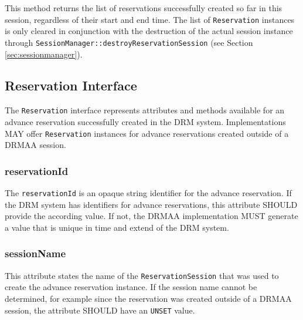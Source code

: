 \documentclass{article}
\newcommand{\h}[1]{\lstinline|#1|}
\newcommand{\rat}[1]{}
\begin{document}
This method returns the list of reservations successfully created so far in this session, regardless of their start and end time. The list of \h{Reservation} instances is only cleared in conjunction with the destruction of the actual session instance through \h{SessionManager::destroyReservationSession} (see Section \ref{sec:sessionmanager}).

\subsection{Reservation Interface}
\label{sec:reservation}

The \h{Reservation} interface represents attributes and methods available for an advance reservation successfully created in the DRM system.  Implementations MAY offer \h{Reservation} instances for advance reservations created outside of a DRMAA session.




\subsubsection{reservationId}
\label{sec:reservationid}

The \h{reservationId} is an opaque string identifier for the advance reservation. If the DRM system has identifiers for advance reservations, this attribute SHOULD provide the according value. If not, the DRMAA implementation MUST generate a value that is unique in time and extend of the DRM system.

\subsubsection{sessionName}

This attribute states the name of the \h{ReservationSession} that was used to create the advance reservation instance. If the session name cannot be determined, for example since the reservation was created outside of a DRMAA session, the attribute SHOULD have an \h{UNSET} value.

\rat{June 29th 2011 conf call decided to return session names instead of session objects. This keeps the consistent approach that instantiated session objects represent a live ``connection'' to the DRMS. Connecting to the referenced session is then a separate explicit step in the application. It also supports better that people create instances from reservation created outside of a DRMAA session.
}
\end{document}
